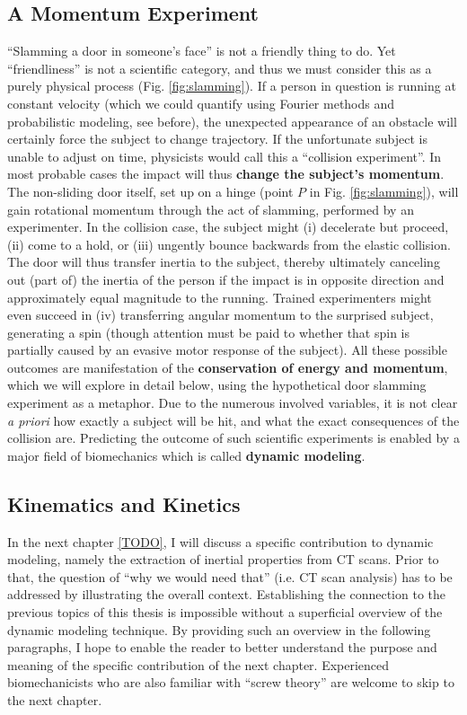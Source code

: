 \subsection{A Momentum Experiment}
\label{sec:orgf6a4372}
``Slamming a door in someone's face'' is not a friendly thing to do.
Yet ``friendliness'' is not a scientific category, and thus we must consider this as a purely physical process (Fig. \ref{fig:slamming}).
If a person in question is running at constant velocity (which we could quantify using Fourier methods and probabilistic modeling, see before), the unexpected appearance of an obstacle will certainly force the subject to change trajectory.
If the unfortunate subject is unable to adjust on time, physicists would call this a ``collision experiment''.
In most probable cases the impact will thus \textbf{change the subject's momentum}.
The non-sliding door itself, set up on a hinge (point \(P\) in Fig. \ref{fig:slamming}), will gain rotational momentum through the act of slamming, performed by an experimenter.
In the collision case, the subject might (i) decelerate but proceed, (ii) come to a hold, or (iii) ungently bounce backwards from the elastic collision.
The door will thus transfer inertia to the subject, thereby ultimately canceling out (part of) the inertia of the person if the impact is in opposite direction and approximately equal magnitude to the running.
Trained experimenters might even succeed in (iv) transferring angular momentum to the surprised subject, generating a spin (though attention must be paid to whether that spin is partially caused by an evasive motor response of the subject).
All these possible outcomes are manifestation of the \textbf{conservation of energy and momentum}, which we will explore in detail below, using the hypothetical door slamming experiment as a metaphor.
Due to the numerous involved variables, it is not clear \emph{a priori} how exactly a subject will be hit, and what the exact consequences of the collision are.
Predicting the outcome of such scientific experiments is enabled by a major field of biomechanics which is called \textbf{dynamic modeling}.


\subsection{Kinematics and Kinetics}
\label{sec:orgf1c6643}
In the next chapter \ref{TODO}, I will discuss a specific contribution to dynamic modeling, namely the extraction of inertial properties from CT scans.
Prior to that, the question of ``why we would need that'' (i.e. CT scan analysis) has to be addressed by illustrating the overall context.
Establishing the connection to the previous topics of this thesis is impossible without a superficial overview of the dynamic modeling technique.
By providing such an overview in the following paragraphs, I hope to enable the reader to better understand the purpose and meaning of the specific contribution of the next chapter.
Experienced biomechanicists who are also familiar with ``screw theory'' are welcome to skip to the next chapter.


